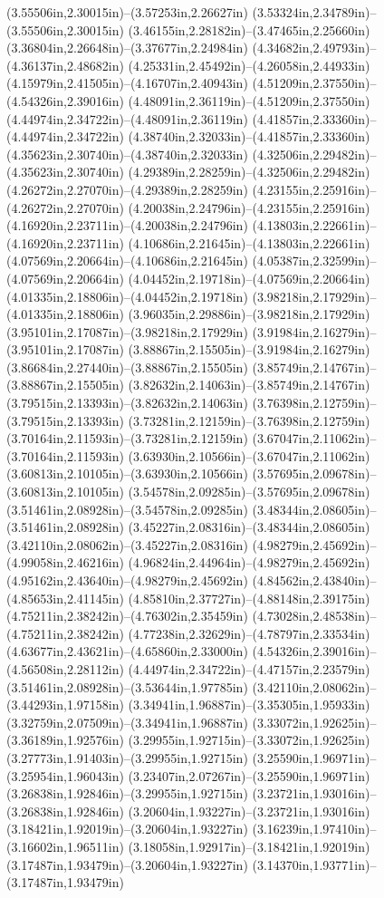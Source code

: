(3.55506in,2.30015in)--(3.57253in,2.26627in) (3.53324in,2.34789in)--(3.55506in,2.30015in) (3.46155in,2.28182in)--(3.47465in,2.25660in) (3.36804in,2.26648in)--(3.37677in,2.24984in) (4.34682in,2.49793in)--(4.36137in,2.48682in) (4.25331in,2.45492in)--(4.26058in,2.44933in) (4.15979in,2.41505in)--(4.16707in,2.40943in) (4.51209in,2.37550in)--(4.54326in,2.39016in) (4.48091in,2.36119in)--(4.51209in,2.37550in) (4.44974in,2.34722in)--(4.48091in,2.36119in) (4.41857in,2.33360in)--(4.44974in,2.34722in) (4.38740in,2.32033in)--(4.41857in,2.33360in) (4.35623in,2.30740in)--(4.38740in,2.32033in) (4.32506in,2.29482in)--(4.35623in,2.30740in) (4.29389in,2.28259in)--(4.32506in,2.29482in) (4.26272in,2.27070in)--(4.29389in,2.28259in) (4.23155in,2.25916in)--(4.26272in,2.27070in) (4.20038in,2.24796in)--(4.23155in,2.25916in) (4.16920in,2.23711in)--(4.20038in,2.24796in) (4.13803in,2.22661in)--(4.16920in,2.23711in) (4.10686in,2.21645in)--(4.13803in,2.22661in) (4.07569in,2.20664in)--(4.10686in,2.21645in) (4.05387in,2.32599in)--(4.07569in,2.20664in) (4.04452in,2.19718in)--(4.07569in,2.20664in) (4.01335in,2.18806in)--(4.04452in,2.19718in) (3.98218in,2.17929in)--(4.01335in,2.18806in) (3.96035in,2.29886in)--(3.98218in,2.17929in) (3.95101in,2.17087in)--(3.98218in,2.17929in) (3.91984in,2.16279in)--(3.95101in,2.17087in) (3.88867in,2.15505in)--(3.91984in,2.16279in) (3.86684in,2.27440in)--(3.88867in,2.15505in) (3.85749in,2.14767in)--(3.88867in,2.15505in) (3.82632in,2.14063in)--(3.85749in,2.14767in) (3.79515in,2.13393in)--(3.82632in,2.14063in) (3.76398in,2.12759in)--(3.79515in,2.13393in) (3.73281in,2.12159in)--(3.76398in,2.12759in) (3.70164in,2.11593in)--(3.73281in,2.12159in) (3.67047in,2.11062in)--(3.70164in,2.11593in) (3.63930in,2.10566in)--(3.67047in,2.11062in) (3.60813in,2.10105in)--(3.63930in,2.10566in) (3.57695in,2.09678in)--(3.60813in,2.10105in) (3.54578in,2.09285in)--(3.57695in,2.09678in) (3.51461in,2.08928in)--(3.54578in,2.09285in) (3.48344in,2.08605in)--(3.51461in,2.08928in) (3.45227in,2.08316in)--(3.48344in,2.08605in) (3.42110in,2.08062in)--(3.45227in,2.08316in) (4.98279in,2.45692in)--(4.99058in,2.46216in) (4.96824in,2.44964in)--(4.98279in,2.45692in) (4.95162in,2.43640in)--(4.98279in,2.45692in) (4.84562in,2.43840in)--(4.85653in,2.41145in) (4.85810in,2.37727in)--(4.88148in,2.39175in) (4.75211in,2.38242in)--(4.76302in,2.35459in) (4.73028in,2.48538in)--(4.75211in,2.38242in) (4.77238in,2.32629in)--(4.78797in,2.33534in) (4.63677in,2.43621in)--(4.65860in,2.33000in) (4.54326in,2.39016in)--(4.56508in,2.28112in) (4.44974in,2.34722in)--(4.47157in,2.23579in) (3.51461in,2.08928in)--(3.53644in,1.97785in) (3.42110in,2.08062in)--(3.44293in,1.97158in) (3.34941in,1.96887in)--(3.35305in,1.95933in) (3.32759in,2.07509in)--(3.34941in,1.96887in) (3.33072in,1.92625in)--(3.36189in,1.92576in) (3.29955in,1.92715in)--(3.33072in,1.92625in) (3.27773in,1.91403in)--(3.29955in,1.92715in) (3.25590in,1.96971in)--(3.25954in,1.96043in) (3.23407in,2.07267in)--(3.25590in,1.96971in) (3.26838in,1.92846in)--(3.29955in,1.92715in) (3.23721in,1.93016in)--(3.26838in,1.92846in) (3.20604in,1.93227in)--(3.23721in,1.93016in) (3.18421in,1.92019in)--(3.20604in,1.93227in) (3.16239in,1.97410in)--(3.16602in,1.96511in) (3.18058in,1.92917in)--(3.18421in,1.92019in) (3.17487in,1.93479in)--(3.20604in,1.93227in) (3.14370in,1.93771in)--(3.17487in,1.93479in) 